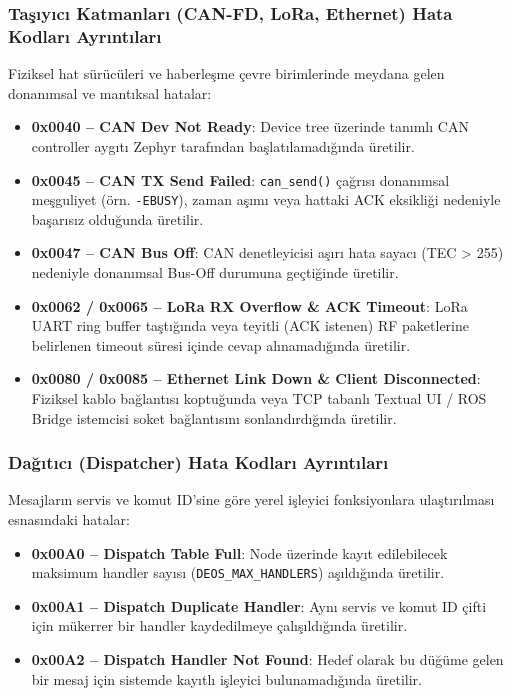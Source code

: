 \documentclass[a4paper,11pt]{article}
\newcommand{\code}[1]{\texttt{#1}}
\begin{document}
\subsubsection{Taşıyıcı Katmanları (CAN-FD, LoRa, Ethernet) Hata Kodları Ayrıntıları}

Fiziksel hat sürücüleri ve haberleşme çevre birimlerinde meydana gelen donanımsal ve mantıksal hatalar:

\begin{itemize}
    \item \textbf{0x0040 -- CAN Dev Not Ready}: Device tree üzerinde tanımlı CAN controller aygıtı Zephyr tarafından başlatılamadığında üretilir.
    \item \textbf{0x0045 -- CAN TX Send Failed}: \code{can\_send()} çağrısı donanımsal meşguliyet (örn. \code{-EBUSY}), zaman aşımı veya hattaki ACK eksikliği nedeniyle başarısız olduğunda üretilir.
    \item \textbf{0x0047 -- CAN Bus Off}: CAN denetleyicisi aşırı hata sayacı (TEC > 255) nedeniyle donanımsal Bus-Off durumuna geçtiğinde üretilir.
    \item \textbf{0x0062 / 0x0065 -- LoRa RX Overflow \& ACK Timeout}: LoRa UART ring buffer taştığında veya teyitli (ACK istenen) RF paketlerine belirlenen timeout süresi içinde cevap alınamadığında üretilir.
    \item \textbf{0x0080 / 0x0085 -- Ethernet Link Down \& Client Disconnected}: Fiziksel kablo bağlantısı koptuğunda veya TCP tabanlı Textual UI / ROS Bridge istemcisi soket bağlantısını sonlandırdığında üretilir.
\end{itemize}

\subsubsection{Dağıtıcı (Dispatcher) Hata Kodları Ayrıntıları}

Mesajların servis ve komut ID'sine göre yerel işleyici fonksiyonlara ulaştırılması esnasındaki hatalar:

\begin{itemize}
    \item \textbf{0x00A0 -- Dispatch Table Full}: Node üzerinde kayıt edilebilecek maksimum handler sayısı (\code{DEOS\_MAX\_HANDLERS}) aşıldığında üretilir.
    \item \textbf{0x00A1 -- Dispatch Duplicate Handler}: Aynı servis ve komut ID çifti için mükerrer bir handler kaydedilmeye çalışıldığında üretilir.
    \item \textbf{0x00A2 -- Dispatch Handler Not Found}: Hedef olarak bu düğüme gelen bir mesaj için sistemde kayıtlı işleyici bulunamadığında üretilir.
\end{itemize}
\end{document}
